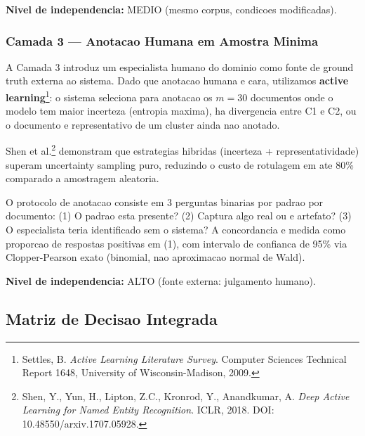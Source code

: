 \textbf{Nivel de independencia:} MEDIO (mesmo corpus, condicoes modificadas).

\subsubsection{Camada 3 — Anotacao Humana em Amostra Minima}

A Camada 3 introduz um especialista humano do dominio como fonte de ground
truth externa ao sistema. Dado que anotacao humana e cara, utilizamos
\textbf{active learning}\footnote{Settles, B. \textit{Active Learning Literature
Survey}. Computer Sciences Technical Report 1648, University of
Wisconsin-Madison, 2009.}: o sistema seleciona para anotacao os $m=30$
documentos onde o modelo tem maior incerteza (entropia maxima), ha divergencia
entre C1 e C2, ou o documento e representativo de um cluster ainda nao anotado.

Shen et al.\footnote{Shen, Y., Yun, H., Lipton, Z.C., Kronrod, Y., Anandkumar,
A. \textit{Deep Active Learning for Named Entity Recognition}. ICLR, 2018. DOI:
10.48550/arxiv.1707.05928.} demonstram que estrategias hibridas (incerteza +
representatividade) superam uncertainty sampling puro, reduzindo o custo de
rotulagem em ate 80\% comparado a amostragem aleatoria.

O protocolo de anotacao consiste em 3 perguntas binarias por padrao por
documento: (1) O padrao esta presente? (2) Captura algo real ou e artefato?
(3) O especialista teria identificado sem o sistema? A concordancia e medida
como proporcao de respostas positivas em (1), com intervalo de confianca de
95\% via Clopper-Pearson exato (binomial, nao aproximacao normal de Wald).

\textbf{Nivel de independencia:} ALTO (fonte externa: julgamento humano).

\subsection{Matriz de Decisao Integrada}

